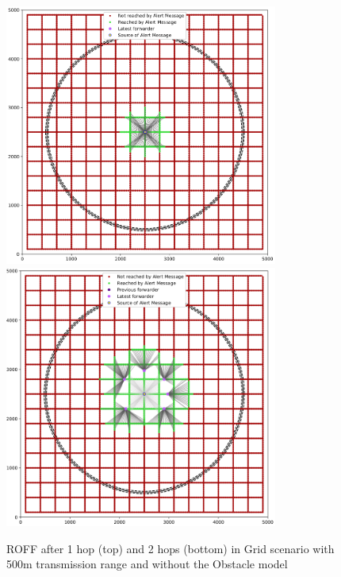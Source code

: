 		\begin{figure}[H]
			\centering
			\includegraphics[width=0.8\textwidth]{immagini/grid-300/b0/roff-1hop}
			\includegraphics[width=0.8\textwidth]{immagini/grid-300/b0/roff-2hop}
			\caption{ROFF after 1 hop (top) and 2 hops (bottom) in Grid scenario with 500m transmission range and without the Obstacle model}
			\label{fig:roff-b0-grid-transmission}
		\end{figure}
	
